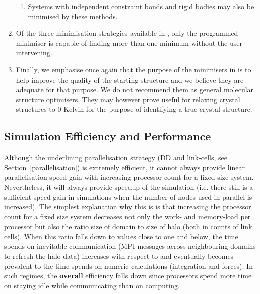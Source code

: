 \begin{enumerate}
\begin{enumerate}
\item Systems with independent constraint bonds and rigid bodies may
also be minimised by these methods.
\end{enumerate}

\item Of the three minimisation strategies available in \D, only the
programmed minimiser is capable of finding more than one minimum
without the user intervening.

\item Finally, we emphasise once again that the purpose of the
minimisers in \D is to help improve the quality of the starting
structure and we believe they are adequate for that purpose.  We do
not recommend them as general molecular structure optimisers.  They
may however prove useful for relaxing crystal structures to 0 Kelvin
for the purpose of identifying a true crystal structure.
\end{enumerate}

\subsection{Simulation Efficiency and Performance}

Although the \D underlining parallelisation strategy (DD and
link-cells, see Section~\ref{parallelisation}) is extremely
efficient, it cannot always provide linear parallelisation speed
gain with increasing processor count for a fixed size system.
Nevertheless, it will always provide speedup of the simulation (i.e.
there still is a sufficient speed gain in simulations when the
number of nodes used in parallel is increased).  The simplest
explanation why this is is that increasing the processor count for a
fixed size system decreases not only the work- and memory-load per
processor but also the ratio size of domain to size of halo (both in
counts of link cells).  When this ratio falls down to values close
to one and below, the time \D spends on inevitable communication
(MPI messages across neighbouring domains to refresh the halo data)
increases with respect to and eventually becomes prevalent to the
time \D spends on numeric calculations (integration and forces).  In
such regimes, the {\bf overall} \D efficiency falls down since
processors spend more time on staying idle while communicating than
on computing.

